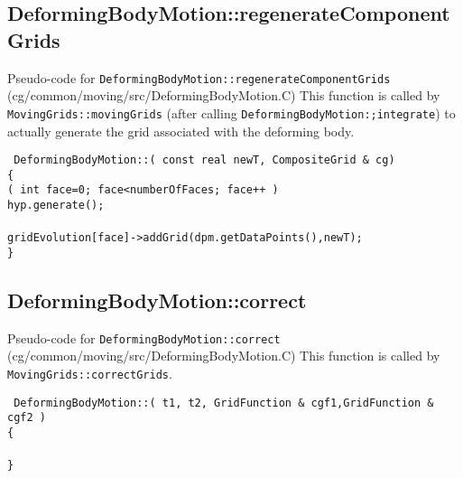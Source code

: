 \documentclass[11pt]{article}
\begin{document}
\subsection{DeformingBodyMotion::regenerateComponentGrids}\label{sec:DeformingBodyMotion::regenerateComponentGrids}

Pseudo-code for {\tt DeformingBodyMotion::regenerateComponentGrids} (cg/common/moving/src/DeformingBodyMotion.C)
This function is called by {\tt MovingGrids::movingGrids} (after calling {\tt DeformingBodyMotion:;integrate})
to actually generate the grid associated with the
deforming body.
\begin{flushleft}\tt
DeformingBodyMotion::( const real newT, CompositeGrid \& cg) \\
\{  \\
\ia \FOR( int face=0; face<numberOfFaces; face++ ) \\
\ib    hyp.generate();   \\
\ib    {} \\
\ib    gridEvolution[face]->addGrid(dpm.getDataPoints(),newT); \\
\}
\end{flushleft}

\subsection{DeformingBodyMotion::correct}\label{sec:DeformingBodyMotion::correct}

Pseudo-code for {\tt DeformingBodyMotion::correct} (cg/common/moving/src/DeformingBodyMotion.C)
This function is called by {\tt MovingGrids::correctGrids}.
\begin{flushleft}\tt
DeformingBodyMotion::( t1, t2, GridFunction \& cgf1,GridFunction \& cgf2 ) \\
\{  \\
\ia {} \\
\}
\end{flushleft}



\clearpage 
\end{document}

